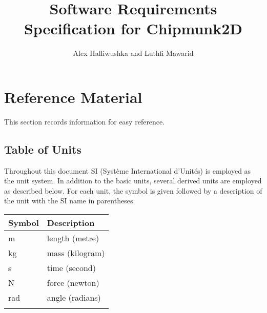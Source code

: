 \documentclass[12pt]{article}
\title{Software Requirements Specification for Chipmunk2D}
\author{Alex Halliwushka and Luthfi Mawarid}
\begin{document}
\maketitle
\tableofcontents
\newpage
\section{Reference Material}
\label{Sec:RM}
This section records information for easy reference.
\subsection{Table of Units}
\label{Sec:ToU}
Throughout this document SI (Syst\`{e}me International d'Unit\'{e}s) is employed as the unit system. In addition to the basic units, several derived units are employed as described below. For each unit, the symbol is given followed by a description of the unit with the SI name in parentheses.
\begin{longtable*}{l l}
\toprule
Symbol & Description
\\
\midrule
m & length (metre)
\\
kg & mass (kilogram)
\\
s & time (second)
\\
N & force (newton)
\\
rad & angle (radians)
\\
\bottomrule
\label{Table:ToU}
\end{longtable*}
\end{document}
